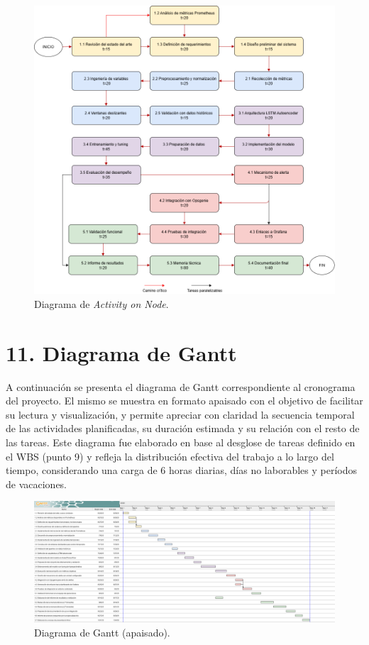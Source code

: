 \documentclass[
11pt, %
]{charter}
\begin{document}
\begin{figure}[htpb]
\centering 
\includegraphics[width=1\textwidth]{./Figuras/AoN.png}
\caption{Diagrama de \textit{Activity on Node}.}
\label{fig:AoN}
\end{figure}



\section{11. Diagrama de Gantt}
\label{sec:gantt}
A continuación se presenta el diagrama de Gantt correspondiente al cronograma del proyecto. El mismo se muestra en formato apaisado con el objetivo de facilitar su lectura y visualización, y permite apreciar con claridad la secuencia temporal de las actividades planificadas, su duración estimada y su relación con el resto de las tareas. Este diagrama fue elaborado en base al desglose de tareas definido en el WBS (punto 9) y refleja la distribución efectiva del trabajo a lo largo del tiempo, considerando una carga de 6 horas diarias, días no laborables y períodos de vacaciones. 
\begin{landscape}
\begin{figure}[H]
\centering
\includegraphics[width=\linewidth,keepaspectratio]{./Figuras/Gantt-2.png}
\caption{Diagrama de Gantt (apaisado).}
\label{fig:diagGantt}

\end{figure}
\end{landscape}
\end{document}
